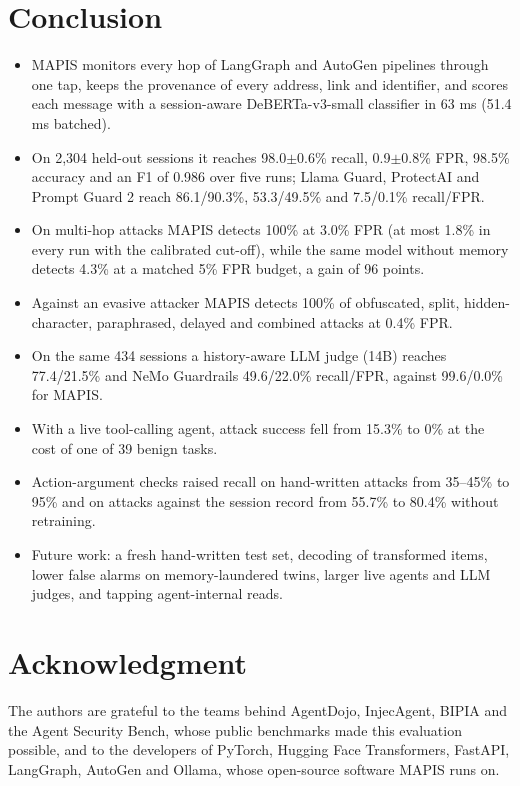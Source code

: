 \documentclass{ieeeaccess}
\begin{document}
\section{Conclusion}
\label{sec:conclusion}
\begin{itemize}
\item MAPIS monitors every hop of LangGraph and AutoGen pipelines through one tap, keeps the provenance of every address, link and identifier, and scores each message with a session-aware DeBERTa-v3-small classifier in 63 ms (51.4 ms batched).
\item On 2,304 held-out sessions it reaches 98.0$\pm$0.6\% recall, 0.9$\pm$0.8\% FPR, 98.5\% accuracy and an F1 of 0.986 over five runs; Llama Guard, ProtectAI and Prompt Guard 2 reach 86.1/90.3\%, 53.3/49.5\% and 7.5/0.1\% recall/FPR.
\item On multi-hop attacks MAPIS detects 100\% at 3.0\% FPR (at most 1.8\% in every run with the calibrated cut-off), while the same model without memory detects 4.3\% at a matched 5\% FPR budget, a gain of 96 points.
\item Against an evasive attacker MAPIS detects 100\% of obfuscated, split, hidden-character, paraphrased, delayed and combined attacks at 0.4\% FPR.
\item On the same 434 sessions a history-aware LLM judge (14B) reaches 77.4/21.5\% and NeMo Guardrails 49.6/22.0\% recall/FPR, against 99.6/0.0\% for MAPIS.
\item With a live tool-calling agent, attack success fell from 15.3\% to 0\% at the cost of one of 39 benign tasks.
\item Action-argument checks raised recall on hand-written attacks from 35--45\% to 95\% and on attacks against the session record from 55.7\% to 80.4\% without retraining.
\item Future work: a fresh hand-written test set, decoding of transformed items, lower false alarms on memory-laundered twins, larger live agents and LLM judges, and tapping agent-internal reads.
\end{itemize}

\section*{Acknowledgment}
The authors are grateful to the teams behind AgentDojo, InjecAgent, BIPIA and the Agent Security Bench, whose public benchmarks made this evaluation possible, and to the developers of PyTorch, Hugging Face Transformers, FastAPI, LangGraph, AutoGen and Ollama, whose open-source software MAPIS runs on.




\EOD
\end{document}
